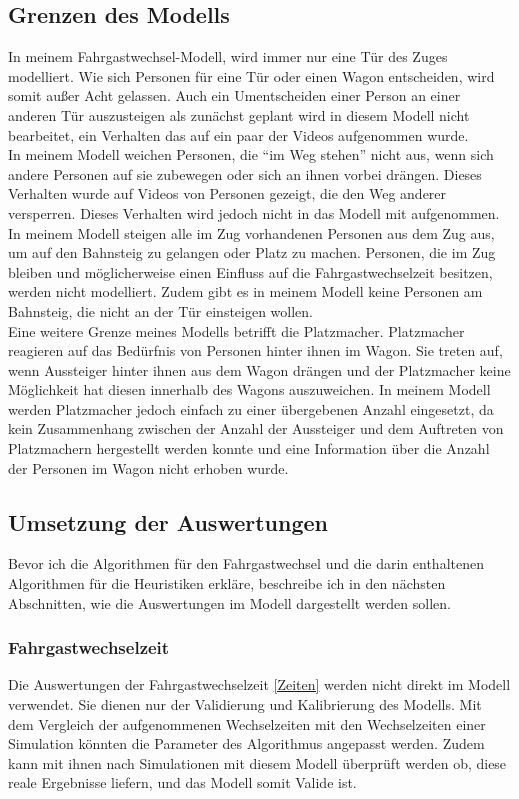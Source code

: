 \subsection{Grenzen des Modells}
In meinem Fahrgastwechsel-Modell, wird immer nur eine Tür des Zuges modelliert. Wie sich Personen für eine Tür oder einen Wagon entscheiden, wird somit außer Acht gelassen. Auch ein Umentscheiden einer Person an einer anderen Tür auszusteigen als zunächst geplant wird in diesem Modell nicht bearbeitet, ein Verhalten das auf ein paar der Videos aufgenommen wurde.\\
In meinem Modell weichen Personen, die "`im Weg stehen"' nicht aus, wenn sich andere Personen auf sie zubewegen oder sich an ihnen vorbei drängen. Dieses Verhalten wurde auf Videos von Personen gezeigt, die den Weg anderer versperren. Dieses Verhalten wird jedoch nicht in das Modell mit aufgenommen. \\
In meinem Modell steigen alle im Zug vorhandenen Personen aus dem Zug aus, um auf den Bahnsteig zu gelangen oder Platz zu machen. Personen, die im Zug bleiben und möglicherweise einen Einfluss auf die Fahrgastwechselzeit besitzen, werden nicht modelliert. Zudem gibt es in meinem Modell keine Personen am Bahnsteig, die nicht an der Tür einsteigen wollen. \\
Eine weitere Grenze meines Modells betrifft die Platzmacher. Platzmacher reagieren auf das Bedürfnis von Personen hinter ihnen im Wagon. Sie treten auf, wenn Aussteiger hinter ihnen aus dem Wagon drängen und der Platzmacher keine Möglichkeit hat diesen innerhalb des Wagons auszuweichen. In meinem Modell werden Platzmacher jedoch einfach zu einer übergebenen Anzahl eingesetzt, da kein Zusammenhang zwischen der Anzahl der Aussteiger und dem Auftreten von Platzmachern hergestellt werden konnte und eine Information über die Anzahl der Personen im Wagon nicht erhoben wurde.
\subsection{Umsetzung der Auswertungen}
Bevor ich die Algorithmen für den Fahrgastwechsel und die darin enthaltenen Algorithmen für die Heuristiken erkläre, beschreibe ich in den nächsten Abschnitten, wie die Auswertungen im Modell dargestellt werden sollen.
\subsubsection{Fahrgastwechselzeit}
Die Auswertungen der Fahrgastwechselzeit \ref{Zeiten} werden nicht direkt im Modell verwendet. Sie dienen nur der Validierung und Kalibrierung des Modells. Mit dem Vergleich der aufgenommenen Wechselzeiten mit den Wechselzeiten einer Simulation könnten die Parameter des Algorithmus angepasst werden. Zudem kann mit ihnen nach Simulationen mit diesem Modell überprüft werden ob, diese reale Ergebnisse liefern, und das Modell somit Valide ist.
